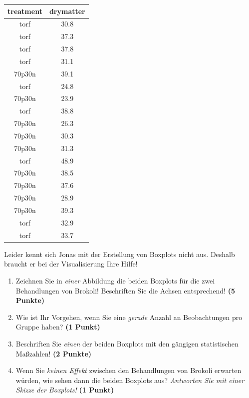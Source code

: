 \documentclass[a4paper, 9pt]{scrartcl}\usepackage[]{graphicx}\usepackage[]{xcolor}
\begin{document}
\begin{table}[!h]
\centering
\begin{tabular}{cc}
\toprule
treatment & drymatter\\
\midrule
torf & 30.8\\
torf & 37.3\\
torf & 37.8\\
torf & 31.1\\
70p30n & 39.1\\
\addlinespace
torf & 24.8\\
70p30n & 23.9\\
torf & 38.8\\
70p30n & 26.3\\
70p30n & 30.3\\
\addlinespace
70p30n & 31.3\\
torf & 48.9\\
70p30n & 38.5\\
70p30n & 37.6\\
70p30n & 28.9\\
\addlinespace
70p30n & 39.3\\
torf & 32.9\\
torf & 33.7\\
\bottomrule
\end{tabular}
\end{table}



Leider kennt sich Jonas mit der Erstellung von Boxplots nicht aus. Deshalb braucht er bei der Visualisierung Ihre Hilfe!

\begin{enumerate}
\item Zeichnen Sie in \textit{einer} Abbildung die beiden Boxplots für die zwei Behandlungen von Brokoli! Beschriften Sie die Achsen entsprechend! \textbf{(5 Punkte)} 
\item Wie ist Ihr Vorgehen, wenn Sie eine \textit{gerade} Anzahl an
  Beobachtungen pro Gruppe haben? \textbf{(1 Punkt)}
\item Beschriften Sie \textit{einen} der beiden Boxplots mit den gängigen
  statistischen Maßzahlen! \textbf{(2 Punkte)}
\item Wenn Sie \textit{keinen Effekt} zwischen den Behandlungen von
  Brokoli erwarten würden, wie sehen dann die beiden Boxplots aus?
  \textit{Antworten Sie mit einer Skizze der Boxplots!}
  \textbf{(1 Punkt)}
\end{enumerate} 
\clearpage
\end{document}
